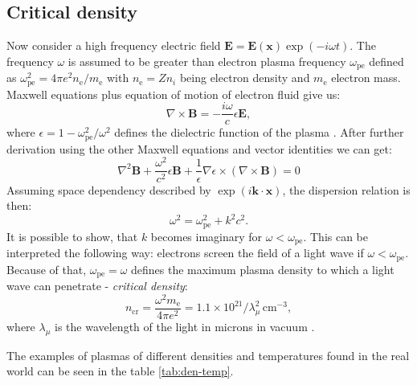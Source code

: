 \subsection*{Critical density}
Now consider a high frequency electric field $\bm{E} = \bm{E(x)}\exp\left(-i\omega t\right)$. The frequency $\omega$ is assumed to be greater than electron plasma frequency $\omega_{\mathrm{pe}}$ defined as $\omega_{\mathrm{pe}}^2=4\pi e^2 n_\mathrm{e}/m_\mathrm{e}$ with $n_\mathrm{e}=Zn_{i}$ being electron density and $m_\mathrm{e}$ electron mass. Maxwell equations plus equation of motion of electron fluid give us:
\begin{equation}
	\nabla \times \bm{B} = -\frac{i\omega}{c}\epsilon\bm{E},
\end{equation}
where $\epsilon = 1 - \omega_{\mathrm{pe}}^2/\omega^2$ defines the dielectric function of the plasma \cite{laser-plasma4}. After further derivation using the other Maxwell equations and vector identities we can get:
\begin{equation}
	\nabla^2 \bm{B} + \frac{\omega^2}{c^2}\epsilon\bm{B} + \frac{1}{\epsilon}\nabla\epsilon \times \left(\nabla \times \bm{B}\right) = 0
\end{equation}
Assuming space dependency described by $\exp\left(i\bm{k}\cdot\bm{x}\right)$, the dispersion relation is then:
\begin{equation}
	\omega^2 = \omega_{\mathrm{pe}}^2 + k^2c^2.
\end{equation}
It is possible to show, that $k$ becomes imaginary for $\omega < \omega_{\mathrm{pe}}$. This can be interpreted the following way: electrons screen the field of a light wave if $\omega < \omega_{\mathrm{pe}}$. Because of that, $\omega_{\mathrm{pe}}=\omega$ defines the maximum plasma density to which a light wave can penetrate - \textit{critical density}:
\begin{equation}
	n_{\mathrm{cr}} = \frac{\omega^2 m_\mathrm{e}}{4 \pi e^2} = 1.1 \times 10^{21} / \lambda_\mu^2 \, \mathrm{cm}^{-3}, 
\end{equation}
where  $\lambda_\mu$ is the wavelength of the light in microns in vacuum \cite{laser-plasma4}.

The examples of plasmas of different densities and temperatures found in the real world can be seen in the table \ref{tab:den-temp}.

